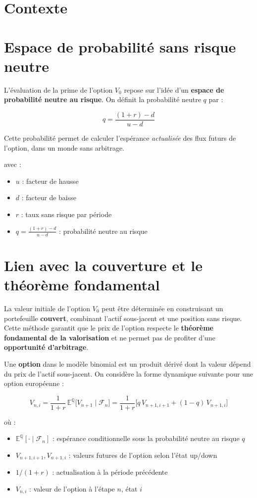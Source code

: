 \documentclass[12pt,a4paper]{report}
\begin{document}
\section*{Contexte}
\section*{Espace de probabilité sans risque neutre}
L'évaluation de la prime de l'option $V_0$ repose sur l'idée d'un \textbf{espace de probabilité neutre au risque}.  
On définit la probabilité neutre $q$ par :

\[
q = \frac{(1+r) - d}{u - d}
\]

Cette probabilité permet de calculer l'espérance \textit{actualisée} des flux futurs de l'option, dans un monde sans arbitrage.

avec :  
\begin{itemize}
    \item $u$ : facteur de hausse  
    \item $d$ : facteur de baisse  
    \item $r$ : taux sans risque par période  
    \item $q = \frac{(1+r)-d}{u-d}$ : probabilité neutre au risque  
\end{itemize}
\section*{Lien avec la couverture et le théorème fondamental}
La valeur initiale de l'option $V_0$ peut être déterminée en construisant un portefeuille \textbf{couvert}, combinant l'actif sous-jacent et une position sans risque.  
Cette méthode garantit que le prix de l'option respecte le \textbf{théorème fondamental de la valorisation} et ne permet pas de profiter d'une \textbf{opportunité d'arbitrage}.

Une \textbf{option} dans le modèle binomial est un produit dérivé dont la valeur dépend du prix de l'actif sous-jacent.  
On considère la forme dynamique suivante pour une option européenne  :

\[
V_{n,i} = \frac{1}{1+r} \, \mathbb{E}^{\mathbb{Q}}\big[ V_{n+1} \mid \mathcal{F}_n \big]
= \frac{1}{1+r} \Big[ q \, V_{n+1,i+1} + (1-q) \, V_{n+1,i} \Big]
\]


où :  
\begin{itemize} 
    \item $\mathbb{E}^{\mathbb{Q}}[\cdot \mid \mathcal{F}_n]$ : espérance conditionnelle sous la probabilité neutre au risque $q$  
    \item $V_{n+1,i+1}, V_{n+1,i}$ : valeurs futures de l'option selon l’état up/down  
    \item $1/(1+r)$ : actualisation à la période précédente  
    \item $V_{n,i}$ : valeur de l'option à l'étape $n$, état $i$
\end{itemize}
\end{document}
